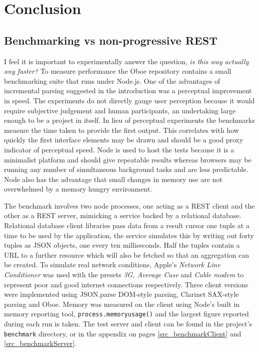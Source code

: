 \documentclass[12pt, ]{article}
\let\stdsection\section
\renewcommand\section{\newpage\stdsection}
\begin{document}
\section{Conclusion}\label{conclusion}

\subsection{Benchmarking vs non-progressive
REST}\label{benchmarking-vs-non-progressive-rest}

I feel it is important to experimentally answer the question, \emph{is
this way actually any faster?} To measure performance the Oboe
repository contains a small benchmarking suite that runs under Node.js.
One of the advantages of incremental parsing suggested in the
introduction was a perceptual improvement in speed. The experiments do
not directly gauge user perception because it would require subjective
judgement and human participants, an undertaking large enough to be a
project in itself. In lieu of perceptual experiments the benchmarks
measure the time taken to provide the first output. This correlates with
how quickly the first interface elements may be drawn and should be a
good proxy indicator of perceptual speed. Node is used to host the tests
because it is a minimalist platform and should give repeatable results
whereas browsers may be running any number of simultaneous background
tasks and are less predictable. Node also has the advantage that small
changes in memory use are not overwhelmed by a memory hungry
environment.

The benchmark involves two node processes, one acting as a REST client
and the other as a REST server, mimicking a service backed by a
relational database. Relational database client libraries pass data from
a result cursor one tuple at a time to be used by the application, the
service simulates this by writing out forty tuples as JSON objects, one
every ten milliseconds. Half the tuples contain a URL to a further
resource which will also be fetched so that an aggregation can be
created. To simulate real network conditions, Apple's \emph{Network Line
Conditioner} was used with the presets \emph{3G, Average Case} and
\emph{Cable modem} to represent poor and good internet connections
respectively. Three client versions were implemented using JSON.parse
DOM-style parsing, Clarinet SAX-style parsing and Oboe. Memory was
measured on the client using Node's built in memory reporting tool,
\texttt{process.memoryusage()} and the largest figure reported during
each run is taken. The test server and client can be found in the
project's \texttt{benchmark} directory, or in the appendix on pages
\ref{src_benchmarkClient} and \ref{src_benchmarkServer}.
\end{document}
